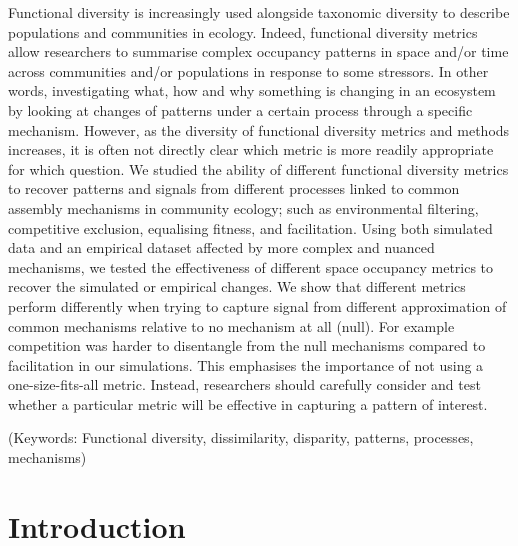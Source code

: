 \documentclass[12pt,letterpaper]{article}
\begin{document}
Functional diversity is increasingly used alongside taxonomic diversity to describe populations and communities in ecology.
Indeed, functional diversity metrics allow researchers to summarise complex occupancy patterns in space and/or time across communities and/or populations in response to some stressors.
In other words, investigating what, how and why something is changing in an ecosystem by looking at changes of patterns under a certain process through a specific mechanism. 
However, as the diversity of functional diversity metrics and methods increases, it is often not directly clear which metric is more readily appropriate for which question.
We studied the ability of different functional diversity metrics to recover patterns and signals from different processes linked to common assembly mechanisms in community ecology; such as environmental filtering, competitive exclusion, equalising fitness, and facilitation.
Using both simulated data and an empirical dataset affected by more complex and nuanced mechanisms, we tested the effectiveness of different space occupancy metrics to recover the simulated or empirical changes.
We show that different metrics perform differently when trying to capture signal from different approximation of common mechanisms relative to no mechanism at all (null).
For example competition was harder to disentangle from the null mechanisms compared to facilitation in our simulations.
This emphasises the importance of not using a one-size-fits-all metric.
Instead, researchers should carefully consider and test whether a particular metric will be effective in capturing a pattern of interest.

\noindent (Keywords: Functional diversity, dissimilarity, disparity, patterns, processes, mechanisms)\\

\newpage

\section{Introduction}
\end{document}
